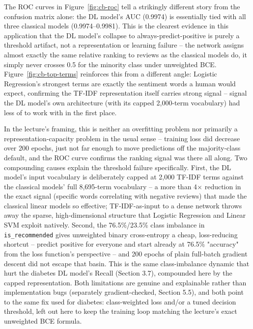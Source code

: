 \documentclass[11pt, a4paper]{article}
\begin{document}
The ROC curves in Figure~\ref{fig:cb-roc} tell a strikingly different story from the
confusion matrix alone: the DL model's AUC (0.9974) is essentially tied with all three
classical models (0.9974--0.9981). This is the clearest evidence in this application that
the DL model's collapse to always-predict-positive is purely a threshold artifact, not a
representation or learning failure -- the network assigns almost exactly the same
relative ranking to reviews as the classical models do, it simply never crosses 0.5 for
the minority class under unweighted BCE. Figure~\ref{fig:cb-top-terms} reinforces this
from a different angle: Logistic Regression's strongest terms are exactly the sentiment
words a human would expect, confirming the TF-IDF representation itself carries strong
signal -- signal the DL model's own architecture (with its capped 2,000-term vocabulary)
had less of to work with in the first place.

In the lecture's framing, this is neither an overfitting problem nor primarily a
representation-capacity problem in the usual sense -- training loss did decrease over 200
epochs, just not far enough to move predictions off the majority-class default, and the
ROC curve confirms the ranking signal was there all along. Two compounding causes explain
the threshold failure specifically. First, the DL model's input vocabulary is
deliberately capped at 2,000 TF-IDF terms against the classical models' full 8,695-term
vocabulary -- a more than 4$\times$ reduction in the exact signal (specific words
correlating with negative reviews) that made the classical linear models so effective;
TF-IDF-as-input to a dense network throws away the sparse, high-dimensional structure
that Logistic Regression and Linear SVM exploit natively. Second, the 76.5\%/23.5\% class
imbalance in \texttt{is\_recommended} gives unweighted binary cross-entropy a cheap,
loss-reducing shortcut -- predict positive for everyone and start already at 76.5\%
"accuracy" from the loss function's perspective -- and 200 epochs of plain full-batch
gradient descent did not escape that basin. This is the same class-imbalance dynamic that
hurt the diabetes DL model's Recall (Section 3.7), compounded here by the capped
representation. Both limitations are genuine and explainable rather than implementation
bugs (separately gradient-checked, Section 5.5), and both point to the same fix used for
diabetes: class-weighted loss and/or a tuned decision threshold, left out here to keep the
training loop matching the lecture's exact unweighted BCE formula.
\end{document}
